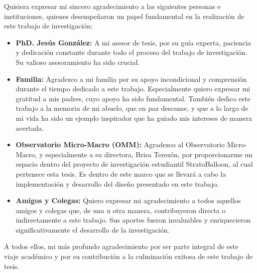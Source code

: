 \documentclass[12pt]{caltech_thesis}
\begin{document}
\begin{acknowledgements}

Quisiera expresar mi sincero agradecimiento a las siguientes personas e instituciones, quienes desempeñaron un papel fundamental en la realización de este trabajo de investigación:

\begin{itemize}
    \item \textbf{PhD. Jesús González:} A mi asesor de tesis, por su guía experta, paciencia y dedicación constante durante todo el proceso del trabajo de investigación. Su valioso asesoramiento ha sido crucial.

    \item \textbf{Familia:} Agradezco a mi familia por su apoyo incondicional y comprensión durante el tiempo dedicado a este trabajo. Especialmente quiero expresar mi gratitud a mis padres, cuyo apoyo ha sido fundamental. También dedico este trabajo a la memoria de mi abuelo, que en paz descanse, y que a lo largo de mi vida ha sido un ejemplo inspirador que ha guiado mis intereses de manera acertada.

    \item \textbf{Observatorio Micro-Macro (OMM):} Agradezco al Observatorio Micro-Macro, y especialmente a su directora, Brisa Terezón, por proporcionarme un espacio dentro del proyecto de investigación estudiantil StratoBalloon, al cual pertenece esta tesis. Es dentro de este marco que se llevará a cabo la implementación y desarrollo del diseño presentado en este trabajo.

    \item \textbf{Amigos y Colegas:} Quiero expresar mi agradecimiento a todos aquellos amigos y colegas que, de una u otra manera, contribuyeron directa o indirectamente a este trabajo. Sus aportes fueron invaluables y enriquecieron significativamente el desarrollo de la investigación.

\end{itemize}

A todos ellos, mi más profundo agradecimiento por ser parte integral de este viaje académico y por su contribución a la culminación exitosa de este trabajo de tesis.

\end{acknowledgements}


\newpage %

\newpage %

\end{document}
